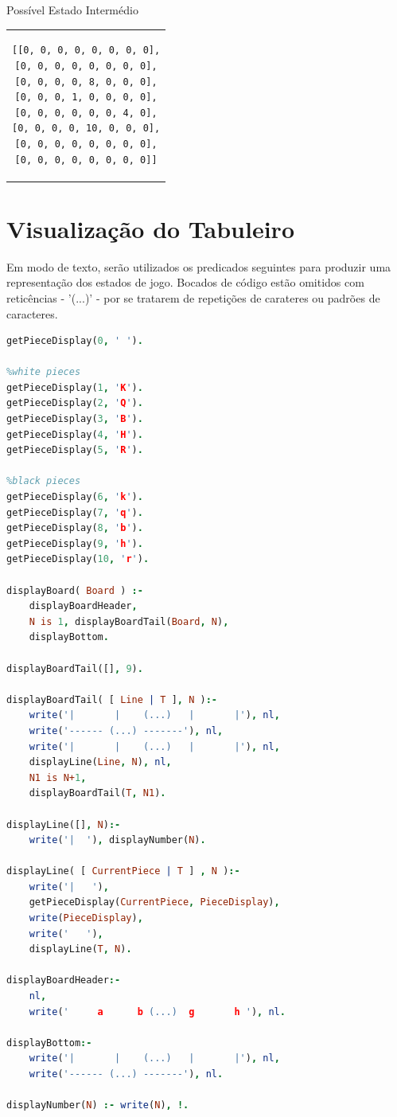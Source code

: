 \documentclass[a4paper]{article}
\begin{document}
\large Possível Estado Intermédio
\begin{center}
\begin{tabular}{c}
\begin{lstlisting}
[[0, 0, 0, 0, 0, 0, 0, 0],
[0, 0, 0, 0, 0, 0, 0, 0],
[0, 0, 0, 0, 8, 0, 0, 0],
[0, 0, 0, 1, 0, 0, 0, 0],
[0, 0, 0, 0, 0, 0, 4, 0],
[0, 0, 0, 0, 10, 0, 0, 0],
[0, 0, 0, 0, 0, 0, 0, 0],
[0, 0, 0, 0, 0, 0, 0, 0]]
\end{lstlisting}
\end{tabular}
\end{center}


\section{Visualização do Tabuleiro}

Em modo de texto, serão utilizados os predicados seguintes para produzir uma representação dos estados de jogo. Bocados de código estão omitidos com reticências - '(...)' - por se tratarem de repetições de carateres ou padrões de caracteres.\linebreak

\begin{lstlisting}[language=Prolog]
getPieceDisplay(0, ' ').

%white pieces
getPieceDisplay(1, 'K').
getPieceDisplay(2, 'Q'). 
getPieceDisplay(3, 'B'). 
getPieceDisplay(4, 'H'). 
getPieceDisplay(5, 'R').

%black pieces
getPieceDisplay(6, 'k'). 
getPieceDisplay(7, 'q').
getPieceDisplay(8, 'b'). 
getPieceDisplay(9, 'h').
getPieceDisplay(10, 'r').

displayBoard( Board ) :-
	displayBoardHeader,
	N is 1, displayBoardTail(Board, N),
	displayBottom.

displayBoardTail([], 9).

displayBoardTail( [ Line | T ], N ):-
	write('|       |    (...)   |       |'), nl,
	write('------ (...) -------'), nl,
	write('|       |    (...)   |       |'), nl,
	displayLine(Line, N), nl,
	N1 is N+1,
	displayBoardTail(T, N1).

displayLine([], N):- 
	write('|  '), displayNumber(N).

displayLine( [ CurrentPiece | T ] , N ):-
	write('|   '),
	getPieceDisplay(CurrentPiece, PieceDisplay),
	write(PieceDisplay),
	write('   '),
	displayLine(T, N).

displayBoardHeader:- 
	nl,
	write('     a      b (...)  g       h '), nl.

displayBottom:-
	write('|       |    (...)   |       |'), nl,
	write('------ (...) -------'), nl.

displayNumber(N) :- write(N), !.
\end{lstlisting}
\end{document}
